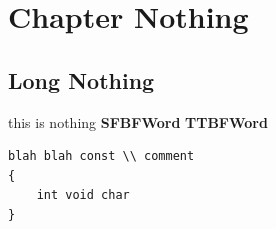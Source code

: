 \documentclass[twoside,10pt,letterpaper,usenames]{newstyle-PearsonGeneric-7-38-ROMEO}
\begin{document}
\cleardoublepage
\tableofcontents
\cleardoublepage

\chapter{Chapter Nothing}

\section[short {\tt nothing}]{Long {\SecCode Nothing}}
this is nothing {\bfseries\sffamily SFBFWord} {\ttfamily\bfseries TTBFWord}

\begin{lstlisting}
blah blah const \\ comment
{
    int void char
}
\end{lstlisting}
\end{document}
